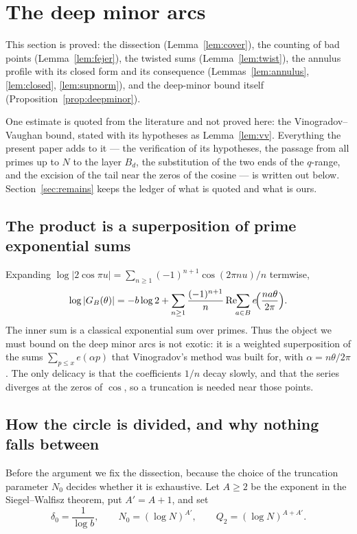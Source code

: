 \documentclass[11pt,a4paper]{article}
\theoremstyle{plain}
\theoremstyle{definition}
\theoremstyle{remark}
\begin{document}
\section{The deep minor arcs}\label{sec:l5c}

This section is proved: the dissection (Lemma~\ref{lem:cover}), the counting of
bad points (Lemma~\ref{lem:fejer}), the twisted sums (Lemma~\ref{lem:twist}),
the annulus profile with its closed form and its consequence
(Lemmas~\ref{lem:annulus}, \ref{lem:closed}, \ref{lem:supnorm}), and the
deep-minor bound itself (Proposition~\ref{prop:deepminor}).

One estimate is quoted from the literature and not proved here: the
Vinogradov--Vaughan bound, stated with its hypotheses as Lemma~\ref{lem:vv}.
Everything the present paper adds to it --- the verification of its hypotheses,
the passage from all primes up to $N$ to the layer $B_d$, the substitution of
the two ends of the $q$-range, and the excision of the tail near the zeros of
the cosine --- is written out below. Section~\ref{sec:remains} keeps the ledger
of what is quoted and what is ours.

\subsection{The product is a superposition of prime exponential sums}

Expanding $\log|2\cos\pi u|=\sum_{n\ge1}(-1)^{n+1}\cos(2\pi nu)/n$ termwise,
\begin{equation}\label{eq:fourier}
  \log|G_B(\theta)|
  =-b\log2+\sum_{n\ge1}\frac{(-1)^{n+1}}{n}\,
     \mathrm{Re}\!\!\sum_{a\in B}e\!\Bigl(\frac{na\theta}{2\pi}\Bigr).
\end{equation}
The inner sum is a classical exponential sum over primes. Thus the object we
must bound on the deep minor arcs is not exotic: it is a weighted superposition
of the sums $\sum_{p\le x}e(\alpha p)$ that Vinogradov's method was built for,
with $\alpha=n\theta/2\pi$. The only delicacy is that the coefficients $1/n$
decay slowly, and that the series diverges at the zeros of $\cos$, so a
truncation is needed near those points.

\subsection{How the circle is divided, and why nothing falls between}

Before the argument we fix the dissection, because the choice of the truncation
parameter $N_0$ decides whether it is exhaustive. Let $A\ge2$ be the exponent in
the Siegel--Walfisz theorem, put $A'=A+1$, and set
\[
  \delta_0=\frac{1}{\log b},\qquad N_0=(\log N)^{A'},\qquad
  Q_2=(\log N)^{A+A'} .
\]
\end{document}
